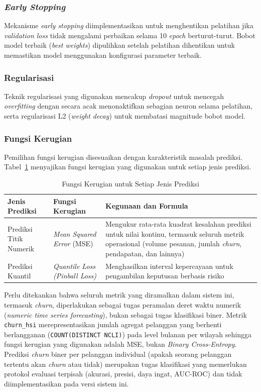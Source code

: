 \subsubsection{\textit{Early Stopping}}

Mekanisme \textit{early stopping} diimplementasikan untuk menghentikan pelatihan jika \textit{validation loss} tidak mengalami perbaikan selama 10 \textit{epoch} berturut-turut. Bobot model terbaik (\textit{best weights}) dipulihkan setelah pelatihan dihentikan untuk memastikan model menggunakan konfigurasi parameter terbaik.

\subsubsection{Regularisasi}

Teknik regularisasi yang digunakan mencakup \textit{dropout} untuk mencegah \textit{overfitting} dengan secara acak menonaktifkan sebagian neuron selama pelatihan, serta regularisasi L2 (\textit{weight decay}) untuk membatasi magnitude bobot model.

\subsubsection{Fungsi Kerugian}

Pemilihan fungsi kerugian disesuaikan dengan karakteristik masalah prediksi. Tabel~\ref{tab:loss-function} menyajikan fungsi kerugian yang digunakan untuk setiap jenis prediksi.

\begin{table}[htbp]
\centering
\caption{Fungsi Kerugian untuk Setiap Jenis Prediksi}
\label{tab:loss-function}
\begin{tabular}{|p{3.5cm}|p{3cm}|p{6cm}|}
\hline
\textbf{Jenis Prediksi} & \textbf{Fungsi Kerugian} & \textbf{Kegunaan dan Formula} \\
\hline
Prediksi Titik Numerik & \textit{Mean Squared Error} (MSE) & Mengukur rata-rata kuadrat kesalahan prediksi untuk nilai kontinu, termasuk seluruh metrik operasional (volume pesanan, jumlah \textit{churn}, pendapatan, dan lainnya) \\
\hline
Prediksi Kuantil & \textit{Quantile Loss (Pinball Loss)} & Menghasilkan interval kepercayaan untuk pengambilan keputusan berbasis risiko \\
\hline
\end{tabular}
\end{table}

Perlu ditekankan bahwa seluruh metrik yang diramalkan dalam sistem ini, termasuk \textit{churn}, diperlakukan sebagai tugas peramalan deret waktu numerik (\textit{numeric time series forecasting}), bukan sebagai tugas klasifikasi biner. Metrik \texttt{churn\_hsi} merepresentasikan jumlah agregat pelanggan yang berhenti berlangganan (\texttt{COUNT(DISTINCT NCLI)}) pada level bulanan per wilayah sehingga fungsi kerugian yang digunakan adalah MSE, bukan \textit{Binary Cross-Entropy}. Prediksi \textit{churn} biner per pelanggan individual (apakah seorang pelanggan tertentu akan \textit{churn} atau tidak) merupakan tugas klasifikasi yang memerlukan protokol evaluasi terpisah (akurasi, presisi, daya ingat, AUC-ROC) dan tidak diimplementasikan pada versi sistem ini.

